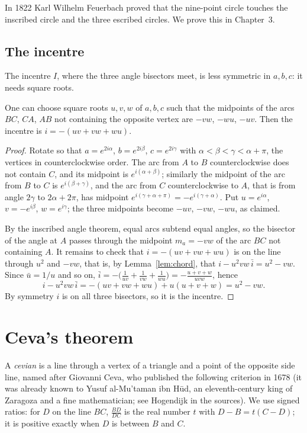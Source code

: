 \begin{remark}
In 1822 Karl Wilhelm Feuerbach proved that the nine-point circle touches the inscribed circle and the three escribed circles. We prove
this in Chapter~3.
\end{remark}

\subsection*{The incentre}

The incentre $I$, where the three angle bisectors meet, is less symmetric in $a,b,c$: it needs square roots.

\begin{proposition}\label{prop:incentre}
One can choose square roots $u,v,w$ of $a,b,c$ such that the midpoints of the arcs $BC$, $CA$, $AB$ not containing the opposite vertex are
$-vw$, $-wu$, $-uv$. Then the incentre is $i=-(uv+vw+wu)$.
\end{proposition}
\begin{proof}
Rotate so that $a=e^{2i\alpha}$, $b=e^{2i\beta}$, $c=e^{2i\gamma}$ with $\alpha<\beta<\gamma<\alpha+\pi$, the vertices in counterclockwise
order. The arc from $A$ to $B$ counterclockwise does not contain $C$, and its midpoint is $e^{i(\alpha+\beta)}$; similarly the
midpoint of the arc from $B$ to $C$ is $e^{i(\beta+\gamma)}$, and the arc from $C$ counterclockwise to $A$, that is from angle $2\gamma$
to $2\alpha+2\pi$, has midpoint $e^{i(\gamma+\alpha+\pi)}=-e^{i(\gamma+\alpha)}$. Put $u=e^{i\alpha}$, $v=-e^{i\beta}$, $w=e^{i\gamma}$; the three
midpoints become $-uv$, $-vw$, $-wu$, as claimed.

By the inscribed angle theorem, equal arcs subtend equal angles, so the bisector of the angle at $A$ passes through the midpoint $m_a=-vw$
of the arc $BC$ not containing $A$. It remains to check that $i=-(uv+vw+wu)$ is on the line through $u^2$ and $-vw$, that is, by
Lemma~\ref{lem:chord}, that $i-u^2vw\,\bar i=u^2-vw$. Since $\bar u=1/u$ and so on, $\bar i=-\bigl(\frac1{uv}+\frac1{vw}+\frac1{wu}\bigr)
=-\frac{u+v+w}{uvw}$, hence
\[
i-u^2vw\,\bar i=-(uv+vw+wu)+u(u+v+w)=u^2-vw .
\]
By symmetry $i$ is on all three bisectors, so it is the incentre.
\end{proof}

\section{Ceva's theorem}

A \emph{cevian} is a line through a vertex of a triangle and a point of the opposite side line, named after Giovanni Ceva, who
published the following criterion in 1678 (it was already known to Yusuf al-Mu'taman ibn H\=ud, an eleventh-century king of Zaragoza
and a fine mathematician; see Hogendijk in the sources). We
use signed ratios: for $D$ on the line $BC$, $\frac{BD}{DC}$ is the real number $t$ with $D-B=t(C-D)$; it is positive exactly when $D$ is
between $B$ and $C$.

